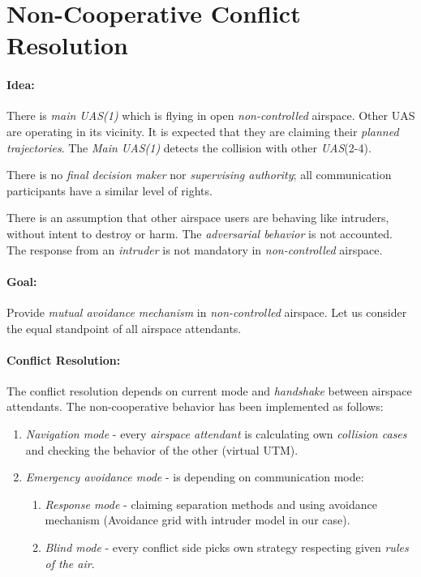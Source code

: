 \newpage
\section{Non-Cooperative Conflict Resolution}\label{app:nonCooperativeConflictResolution}

\paragraph{Idea:} There is \emph{main UAS(1)} which is flying in open \emph{non-controlled} airspace. Other UAS are operating in its vicinity. It is expected that they are claiming their \emph{planned trajectories}. The \emph{Main UAS(1)} detects the collision with other \emph{UAS}(2-4).

There is no \emph{final decision maker} nor \emph{supervising authority}; all communication participants have a similar level of rights. 
\begin{note}
    There is an assumption that other airspace users are behaving like intruders, without intent to destroy or harm. The \emph{adversarial behavior} is not accounted. The response from an \emph{intruder} is not mandatory in \emph{non-controlled} airspace.
\end{note}

\paragraph{Goal:} Provide \emph{mutual avoidance mechanism} in \emph{non-controlled} airspace. Let us consider the equal standpoint of all airspace attendants.

\paragraph{Conflict Resolution:} The conflict resolution depends on current mode and \emph{handshake} between airspace attendants. The non-cooperative behavior has been implemented as follows:

\begin{enumerate}
    \item\emph{Navigation mode} - every \emph{airspace attendant} is calculating own \emph{collision cases} and checking the behavior of the other (virtual UTM).
    
    \item\emph{Emergency avoidance mode} - is depending on communication mode:
    \begin{enumerate}[a]
        \item\emph{Response mode} - claiming separation methods and using avoidance mechanism (Avoidance grid with intruder model in our case).
        
        \item\emph{Blind mode} - every conflict side picks own strategy respecting given \emph{rules of the air}.
    \end{enumerate}
\end{enumerate}

